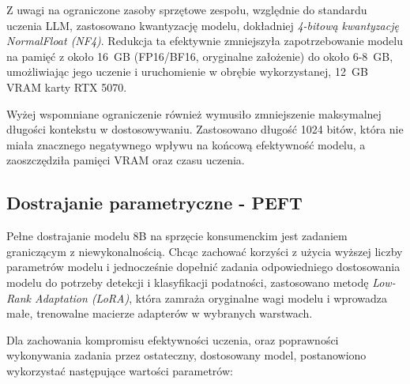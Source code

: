\documentclass[12pt,a4paper]{article}
\begin{document}
Z uwagi na ograniczone zasoby sprzętowe zespołu, względnie do standardu uczenia LLM, zastosowano kwantyzację modelu, dokładniej \emph{4-bitową 
kwantyzację NormalFloat (NF4)}. Redukcja ta efektywnie zmniejszyła zapotrzebowanie modelu na pamięć z około 16~GB (FP16/BF16, oryginalne założenie)
do około 6-8~GB, umożliwiając jego uczenie i uruchomienie w obrębie wykorzystanej, 12~GB VRAM karty RTX 5070.

Wyżej wspomniane ograniczenie również wymusiło zmniejszenie maksymalnej długości kontekstu w dostosowywaniu. Zastosowano długość 1024 bitów, która nie 
miała znacznego negatywnego wpływu na końcową efektywność modelu, a zaoszczędziła pamięci VRAM oraz czasu uczenia. 

\subsection{Dostrajanie parametryczne - PEFT}
\label{ssec:model_peft}


Pełne dostrajanie modelu 8B na sprzęcie konsumenckim jest zadaniem graniczącym z niewykonalnością. Chcąc zachować korzyści z użycia wyższej liczby parametrów modelu i 
jednocześnie dopełnić zadania odpowiedniego dostosowania modelu do potrzeby detekcji i klasyfikacji podatności, zastosowano metodę \emph{Low-Rank Adaptation (LoRA)}, która
zamraża oryginalne wagi modelu i wprowadza małe, trenowalne macierze adapterów w wybranych warstwach.

Dla zachowania kompromisu efektywności uczenia, oraz poprawności wykonywania zadania przez ostateczny, dostosowany model, postanowiono wykorzystać następujące wartości parametrów:
\end{document}
